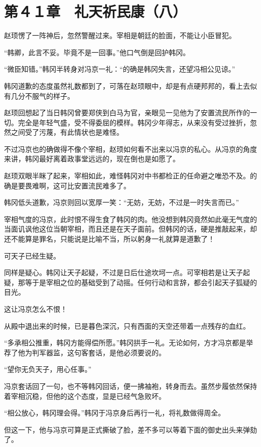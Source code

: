 \section{第４１章　礼天祈民康（八）}

赵顼愣了一阵神后，忽然警醒过来。宰相是朝廷的脸面，不能让小臣冒犯。

“韩卿，此言不妥。毕竟不是一回事。”他口气倒是回护韩冈。

“微臣知错。”韩冈半转身对冯京一礼：“的确是韩冈失言，还望冯相公见谅。”

韩冈道歉的态度虽然礼数都到了，可落在赵顼眼中，却是有点硬邦邦的，看上去似有几分不服气的样子。

赵顼回想起了当日韩冈曾要郑侠到白马为官，亲眼见一见他为了安置流民所作的一切。完全是年轻气盛，受不得委屈的模样。韩冈少年得志，从来没有受过挫折，忽然之间受了污蔑，有此情状也是难怪。

不过冯京也的确做得不像个宰相，赵顼如何看不出来以冯京的私心。从冯京的角度来讲，韩冈最好离着政事堂远远的，现在倒也是如愿了。

赵顼双眼半眯了起来，宰相如此，难怪韩冈对中书都检正的任命避之唯恐不及。的确是要畏难啊，这可比安置流民难多了。

韩冈低头道歉，冯京则回以宽厚一笑：“无妨，无妨，不过是一时失言而已。”

宰相气度的冯京，此时恨不得生食了韩冈的肉。他没想到韩冈竟然如此毫无气度的当面讥讽他这位当朝宰相，而且还是在天子面前。但韩冈的话，硬是推敲起来，却还不能算是罪名，只能说是比喻不当，所以躬身一礼就算是道歉了！

可天子已经生疑。

同样是疑心。韩冈让天子起疑，不过是日后仕途坎坷一点。可宰相若是让天子起疑，那等于是宰相之位的基础受到了动摇。任何行动和言辞，都会引起天子狐疑的目光。

这让冯京怎么不恨！

从殿中退出来的时候，已是暮色深沉，只有西面的天空还带着一点残存的血红。

“多承相公推重，韩冈方能得偿所愿。”韩冈拱手一礼。无论如何，方才冯京都是举荐了他为判军器监，这句客套话，是他必须要说的。

“望你无负天子，用心任事。”

冯京套话回了一句，也不等韩冈回话，便一拂袖袍，转身而去。虽然步履依然保持着宰相沉稳，但他的这个态度，显是已经气急败坏。

“相公放心，韩冈理会得。”韩冈于冯京身后再行一礼，将礼数做得周全。

但这一下，他与冯京可算是正式撕破了脸，差不多可以等着下面的御史出头来弹劾了。

